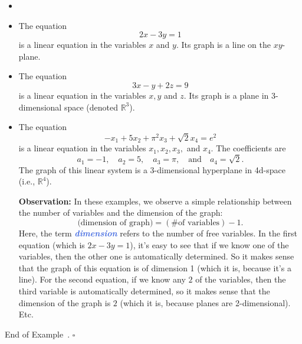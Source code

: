 \documentclass[10pt]{article}
\newcommand{\demph}[1]{\textcolor{RoyalBlue}{\textbf{\slshape #1}}} %
\theoremstyle{definition}
\newtheorem{example}[theorem]{Example}
\renewenvironment{example}
{\begin{oldexample}}
  {\par\smallskip\hfill   End of Example~\theexample. $\square$    \par\end{oldexample}}
\newcommand{\fl}[1]{\noindent\textbf{#1}}            %
\newcommand{\R}{\mathbb{R}}           %
\begin{document}
\begin{example}[Examples of linear equations]
  \label{ex:examples-linear-equations-first-examples}
  \begin{itemize}
    \item[]
    \item The equation
    \begin{equation*}
      2x-3y =1
    \end{equation*}
    is a linear equation in the variables $x$ and $y$. Its graph is a line on the
    $xy$-plane.
    \item The equation
    \begin{equation*}
      3x-y+2z = 9
    \end{equation*}
    is a linear equation in the variables $x,y$ and $z$. Its graph is a plane
    in 3-dimensional space (denoted $\R^{3}$).
    \item The equation
    \begin{equation*}
      -x_{1} +5 x_{2}+ \pi^{2} x_{3}+ \sqrt{2}x_{4} = e^{2}
    \end{equation*}
    is a linear equation in the variables $x_{1},x_{2},x_{3},$ and $x_{4}$.
    The coefficients are
    \begin{equation*}
      a_{1} = -1, \quad a_{2} = 5, \quad a_{3} = \pi, \quad \text{and} \quad a_{4}=\sqrt{2}.
    \end{equation*}
    The graph of this linear system is a 3-dimensional hyperplane in 4d-space
    (i.e., $\R^{4}$).

    \fl{Observation:} In these examples, we observe a simple relationship
    between the number of variables and the dimension of the graph:
    \begin{equation*}
      \text{(dimension of graph)} = (\text{\# of variables}) - 1.
    \end{equation*}
    Here, the term \demph{dimension} refers to the number of free variables.
    In the first equation (which is $2x-3y=1$), it's easy to see that if we
    know one of the variables, then the other one is automatically determined.
    So it makes sense that the graph of this equation is of dimension 1 (which
    it is, because it's a line). For the second equation, if we know any $2$
    of the variables, then the third variable is automatically determined, so
    it makes sense that the dimension of the graph is $2$ (which it is,
    because planes are 2-dimensional). Etc.
  \end{itemize}

\end{example}
\end{document}
